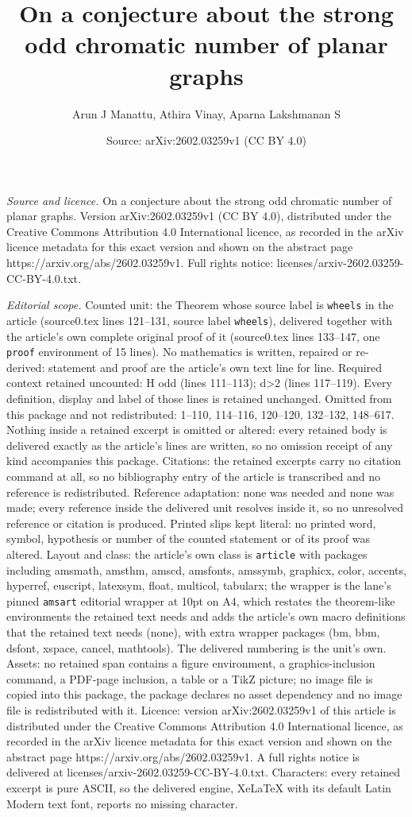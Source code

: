 \documentclass[10pt,a4paper]{amsart}
\title[On a conjecture about the strong odd chromatic number of pla]{On a conjecture about the strong odd chromatic number of planar graphs}
\author{Arun J Manattu, Athira Vinay, Aparna Lakshmanan S}
\date{Source: arXiv:2602.03259v1 (CC BY 4.0)}
\begin{document}
\maketitle

\noindent\emph{Source and licence.} On a conjecture about the strong odd chromatic number of planar graphs. Version arXiv:2602.03259v1 (CC BY 4.0), distributed under the Creative Commons Attribution 4.0 International licence, as recorded in the arXiv licence metadata for this exact version and shown on the abstract page https://arxiv.org/abs/2602.03259v1. Full rights notice: licenses/arxiv-2602.03259-CC-BY-4.0.txt.\par\smallskip

\noindent\textit{Editorial scope.} Counted unit: the Theorem whose source label is \texttt{wheels} in the article (source0.tex lines 121--131, source label \texttt{wheels}), delivered together with the article's own complete original proof of it (source0.tex lines 133--147, one \texttt{proof} environment of 15 lines). No mathematics is written, repaired or re-derived: statement and proof are the article's own text line for line. Required context retained uncounted: H odd (lines 111--113); d>2 (lines 117--119). Every definition, display and label of those lines is retained unchanged. Omitted from this package and not redistributed: 1--110, 114--116, 120--120, 132--132, 148--617. Nothing inside a retained excerpt is omitted or altered: every retained body is delivered exactly as the article's lines are written, so no omission receipt of any kind accompanies this package. Citations: the retained excerpts carry no citation command at all, so no bibliography entry of the article is transcribed and no reference is redistributed. Reference adaptation: none was needed and none was made; every reference inside the delivered unit resolves inside it, so no unresolved reference or citation is produced. Printed slips kept literal: no printed word, symbol, hypothesis or number of the counted statement or of its proof was altered. Layout and class: the article's own class is \texttt{article} with packages including amsmath, amsthm, amscd, amsfonts, amssymb, graphicx, color, accents, hyperref, euscript, latexsym, float, multicol, tabularx; the wrapper is the lane's pinned \texttt{amsart} editorial wrapper at 10pt on A4, which restates the theorem-like environments the retained text needs and adds the article's own macro definitions that the retained text needs (none), with extra wrapper packages (bm, bbm, dsfont, xspace, cancel, mathtools). The delivered numbering is the unit's own. Assets: no retained span contains a figure environment, a graphics-inclusion command, a PDF-page inclusion, a table or a TikZ picture; no image file is copied into this package, the package declares no asset dependency and no image file is redistributed with it. Licence: version arXiv:2602.03259v1 of this article is distributed under the Creative Commons Attribution 4.0 International licence, as recorded in the arXiv licence metadata for this exact version and shown on the abstract page https://arxiv.org/abs/2602.03259v1. A full rights notice is delivered at licenses/arxiv-2602.03259-CC-BY-4.0.txt. Characters: every retained excerpt is pure ASCII, so the delivered engine, XeLaTeX with its default Latin Modern text font, reports no missing character.
\end{document}
